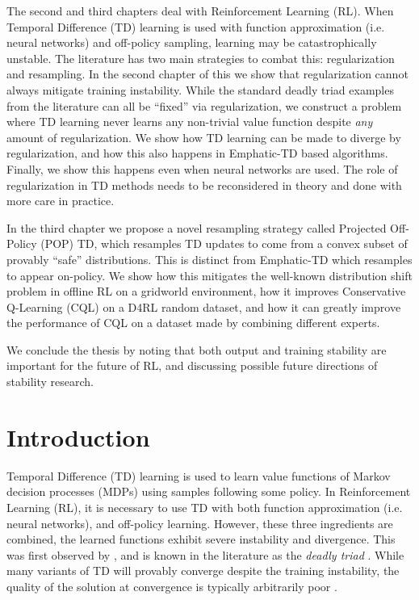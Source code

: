 \documentclass[11pt]{book}
\begin{document}
The second and third chapters deal with Reinforcement Learning (RL). When Temporal Difference (TD) learning is used with function approximation (i.e. neural networks) and off-policy sampling, learning may be catastrophically unstable. The literature has two main strategies to combat this: regularization and resampling.
In the second chapter of this we show that regularization cannot always mitigate training instability. While the standard deadly triad examples from the literature can all be ``fixed'' via regularization, we construct a problem where TD learning never learns any non-trivial value function despite \emph{any} amount of regularization. We show how TD learning can be made to diverge by regularization, and how this also happens in Emphatic-TD based algorithms. Finally, we show this happens even when neural networks are used. The role of regularization in TD methods needs to be reconsidered in theory and done with more care in practice.

In the third chapter we propose a novel resampling strategy called Projected Off-Policy (POP) TD, which resamples TD updates to come from a convex subset of provably ``safe'' distributions. This is distinct from Emphatic-TD which resamples to appear on-policy. We show how this mitigates the well-known distribution shift problem in offline RL on a gridworld environment, how it improves Conservative Q-Learning (CQL) on a D4RL random dataset, and how it can greatly improve the performance of CQL on a dataset made by combining different experts.

We conclude the thesis by noting that both output and training stability are important for the future of RL, and discussing possible future directions of stability research.

\clearpage

\tableofcontents

\cleardoublepage

\linenumbers

\chapter{Introduction}

Temporal Difference (TD) learning is used to learn value functions of Markov decision processes (MDPs) using samples following some policy. In Reinforcement Learning (RL), it is necessary to use TD with both function approximation (i.e. neural networks), and off-policy learning. However, these three ingredients are combined, the learned functions exhibit severe instability and divergence. This was first observed by \citet{tsitsiklis1996analysis}, and is known in the literature as the \emph{deadly triad} \cite[p.~264]{sutton2020reinforcement}. While many variants of TD will provably converge despite the training instability, the quality of the solution at convergence is typically arbitrarily poor \citep{kolter2011fixed}.
\end{document}
